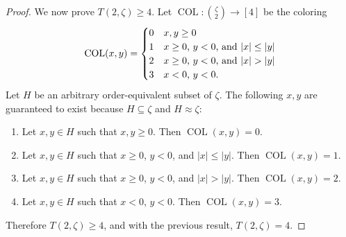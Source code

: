 \documentclass[11pt]{article}
\newcommand{\oequiv}{\approx}
\newcommand{\COL}{\operatorname{COL}}
\theoremstyle{plain}
\theoremstyle{definition}
\begin{document}
\begin{proof}
We now prove $T(2,\zeta)\geq 4$. Let $\COL\colon\binom{\zeta}{2}\to [4]$ be the coloring
\begin{align*}
\COL(x,y)=
\begin{cases}
0 & \text{$x,y\geq 0$} \cr
1 & \text{$x\geq 0$, $y<0$, and $|x|\leq |y|$} \cr
2 & \text{$x\geq 0$, $y<0$, and $|x|> |y|$} \cr
3 & \text{$x<0$, $y<0$.} \cr
\end{cases}
\end{align*}
Let $H$ be an arbitrary order-equivalent subset of $\zeta.$
The following $x,y$ are guaranteed to exist because $H \subseteq \zeta$ and $H \oequiv \zeta$:
\begin{enumerate} %
\item
Let $x,y\in H$ such that $x,y\ge 0$. Then $\COL(x,y)=0$. 
\item
Let $x,y\in H$ such that $x\ge 0$, $y<0$, and $|x|\le |y|$. Then $\COL(x,y)=1$. 
\item 
Let $x,y\in H$ such that $x\ge 0$, $y<0$, and $|x|>|y|$. Then $\COL(x,y)=2$. 
\item
Let $x,y\in H$ such that $x<0$, $y<0$. Then $\COL(x,y)=3$. 
\end{enumerate}  %
Therefore $T(2,\zeta)\geq 4$, and with the previous result, $T(2,\zeta) = 4$.
\end{proof}
\end{document}
